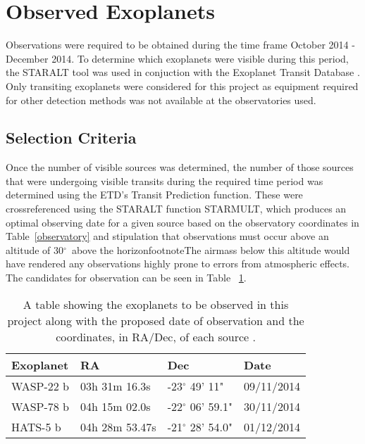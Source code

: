\documentclass{report}
\begin{document}

\section{Observed Exoplanets}
Observations were required to be obtained during the time frame October 2014 - December 2014. To determine which exoplanets were visible during this period, the STARALT tool \parencite{staralt} was used in conjuction with the Exoplanet Transit Database \parencite{etd}. Only transiting exoplanets were considered for this project as equipment required for other detection methods was not available at the observatories used. 

\subsection{Selection Criteria}
Once the number of visible sources was determined, the number of those sources that were undergoing visible transits during the required time period was determined using the ETD's Transit Prediction function. These were crossreferenced using the STARALT function STARMULT, which produces an optimal observing date for a given source based on the observatory coordinates in Table~\ref{observatory} and stipulation that observations must occur above an altitude of 30$^\circ$\ above the horizonfootnote{The airmass below this altitude would have rendered any observations highly prone to errors from atmospheric effects}. The candidates for observation can be seen in Table ~\ref{planets}.

\begin{table}[H]
    \centering
    \begin{tabular}{ | l | l | l | l | }
    \hline \hline
    Exoplanet & RA & Dec & Date       \\ \hline \hline
    WASP-22 b    & 03h 31m 16.3s & -23$^\circ$ 49' 11" & 09/11/2014 \\
    WASP-78 b   & 04h 15m 02.0s & -22$^\circ$ 06' 59.1" & 30/11/2014 \\
    HATS-5 b  & 04h 28m 53.47s & -21$^\circ$ 28' 54.0" & 01/12/2014 \\
    \hline
    \end{tabular}
    \caption{A table showing the exoplanets to be observed in this project along with the proposed date of observation and the coordinates, in RA/Dec, of each source \parencite{etd}.}
    \label{planets}
\end{table}
\end{document}
